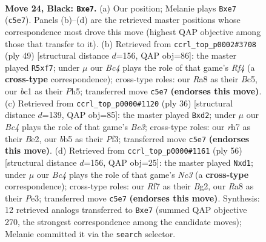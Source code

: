 \documentclass[11pt]{article}
\begin{document}
\clearpage

\begin{figure}[p]\centering
\begin{subfigure}{0.46\textwidth}\centering
\resizebox{\linewidth}{!}{%
\newchessgame
\chessboard[
  setfen={r3k3/pp2Qr1R/2n3p1/1Bb3P1/P7/2N2N2/1P3P2/R1B1K3 b Q - 0 24},
  showmover=false,
  pgfstyle=straightmove, color=movearrow, markmove={c5-e7}
]}
\caption{}
\end{subfigure}\hfill
\begin{subfigure}{0.46\textwidth}\centering
\resizebox{\linewidth}{!}{%
\newchessgame
\chessboard[
  setfen={5rk1/5Qp1/1pn1p3/2b2r1p/2p4P/2B2N2/PP3PP1/3R1RK1 b - - 0 25},
  showmover=false,
  pgfstyle=straightmove, color=movearrow, markmove={f5-f7}
]}
\caption{}
\end{subfigure}
\\[4pt]
\begin{subfigure}{0.46\textwidth}\centering
\resizebox{\linewidth}{!}{%
\newchessgame
\chessboard[
  setfen={r3r1k1/pp3pbp/6p1/4nN2/8/1P2BP2/P2qB1PP/3RK2R w K - 0 19},
  showmover=false,
  pgfstyle=straightmove, color=movearrow, markmove={e3-d2}
]}
\caption{}
\end{subfigure}\hfill
\begin{subfigure}{0.46\textwidth}\centering
\resizebox{\linewidth}{!}{%
\newchessgame
\chessboard[
  setfen={1r4bk/1p4pp/2n4b/p1R5/P1N1p2P/1PN1P1P1/6B1/3q2K1 w - - 0 29},
  showmover=false,
  pgfstyle=straightmove, color=movearrow, markmove={c3-d1}
]}
\caption{}
\end{subfigure}
\caption{\textbf{Move 24, Black: \texttt{Bxe7}.} (a) Our position; Melanie plays \texttt{Bxe7} (\texttt{c5e7}). Panels (b)--(d) are the retrieved master positions whose correspondence most drove this move (highest QAP objective among those that transfer to it). (b) Retrieved from \texttt{ccrl\_top\_p0002\#3708} (ply 49) [structural distance $d$=156, QAP obj=86]: the master played \texttt{R5xf7}; under $\mu$ our \emph{Bc4} plays the role of that game's \emph{Rf4} (a \textbf{cross-type} correspondence); cross-type roles: our \emph{R}a8 as their \emph{B}c5, our \emph{b}c1 as their \emph{P}h5; transferred move \texttt{c5e7} \textbf{(endorses this move)}. (c) Retrieved from \texttt{ccrl\_top\_p0000\#1120} (ply 36) [structural distance $d$=139, QAP obj=85]: the master played \texttt{Bxd2}; under $\mu$ our \emph{Bc4} plays the role of that game's \emph{Be3}; cross-type roles: our \emph{r}h7 as their \emph{B}e2, our \emph{b}b5 as their \emph{P}f3; transferred move \texttt{c5e7} \textbf{(endorses this move)}. (d) Retrieved from \texttt{ccrl\_top\_p0000\#1161} (ply 56) [structural distance $d$=156, QAP obj=25]: the master played \texttt{Nxd1}; under $\mu$ our \emph{Bc4} plays the role of that game's \emph{Nc3} (a \textbf{cross-type} correspondence); cross-type roles: our \emph{R}f7 as their \emph{B}g2, our \emph{R}a8 as their \emph{P}e3; transferred move \texttt{c5e7} \textbf{(endorses this move)}. Synthesis: 12 retrieved analogs transferred to \texttt{Bxe7} (summed QAP objective 270, the strongest correspondence among the candidate moves); Melanie committed it via the \texttt{search} selector.}
\label{fig:thought-m47}
\end{figure}
\end{document}
